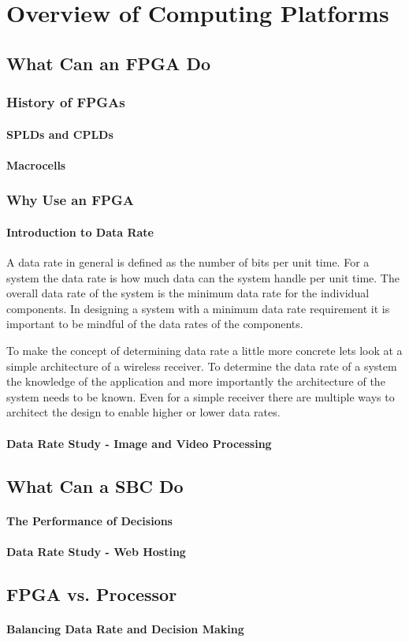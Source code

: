 \chapter{Overview of Computing Platforms}

\section{What Can an FPGA Do}

\subsection{History of FPGAs}
\subsubsection{SPLDs and CPLDs}
\subsubsection{Macrocells}

\subsection{Why Use an FPGA}
\subsubsection{Introduction to Data Rate}
A data rate in general is defined as the number of bits per unit time. For a system the data rate is how much data can the system handle per unit time. The overall data rate of the system is the minimum data rate for the individual components. In designing a system with a minimum data rate requirement it is important to be mindful of the data rates of the components.

To make the concept of determining data rate a little more concrete lets look at a simple architecture of a wireless receiver. To determine the data rate of a system the knowledge of the application and more importantly the architecture of the system needs to be known. Even for a simple receiver there are multiple ways to architect the design to enable higher or lower data rates. 

\subsubsection{Data Rate Study - Image and Video Processing}

\section{What Can a SBC Do}
\subsubsection{The Performance of Decisions}
\subsubsection{Data Rate Study - Web Hosting}

\section{FPGA vs. Processor}
\subsubsection{Balancing Data Rate and Decision Making}


